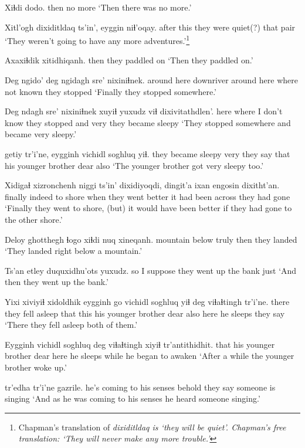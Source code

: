 \documentclass[12pt]{article}
\begin{document}
\gll Xiɬdi dodo.
then {no more}
\glt `Then there was no more.'
\glend

\gll Xitl'ogh dixiditldaq  ts'in', eyggin niɬ'oqay.
{after this} {they were quiet(?)} {} that  pair
\glt `They weren't going to have any more adventures.'\footnote{Chapman's translation of \em dixiditldaq \em is `they will be quiet'. Chapman's free translation: `They will never make any more trouble.'}
\glend

\gll Axaxiɬdik xitidhiqanh.
then  {they paddled on}
\glt `Then they paddled on.'
\glend

\gll Deg ngido' deg ngidagh sre' nixiniɬnek.
{around here} downriver {around here} where {not known} {they stopped}
\glt `Finally they stopped somewhere.'
\glend

\gll Deg ndagh sre'  nixiniɬnek xuyiɬ yuxudz {viɬ dixivitathdlen'.}
here where {I don't know} {they stopped} and very {they became sleepy}
\glt `They stopped somewhere and became very sleepy.'
\glend

 getiy tr'i'ne, eygginh vichidl  soghluq yiɬ.
{they became sleepy}  very {they say} that {his younger brother} dear also
\glt `The younger brother got very sleepy too.'
\glend

\gll Xidigaɬ xizronchenh {niggi ts'in'} dixidiyoqdi, {dingit'a ixan} engosin dixitht'an.
finally  indeed  {to shore} {when they went} {better it had been} across {they had gone}
\glt `Finally they went to shore, (but) it would have been better if they had gone to the other shore.'
\glend

\gll Deloy  ghotthegh ɬogo xiɬdi {nuq xineqanh.}
mountain below  truly then {they landed}
\glt `They landed right below a mountain.'
\glend

\gll Ts'an etley  duquxidhu'ots  yuxudz.
so {I suppose} {they went up the bank} just
\glt `And then they went up the bank.'
\glend

\gll Yixi {xiviyiɬ xidoldhik} eygginh go vichidl soghluq yiɬ deg viɬaɬtingh tr'i'ne.
there {they fell asleep} that this {his younger brother} dear also here {he sleeps} {they say}
\glt `There they fell asleep both of them.'
\glend

\gll Eygginh vichidl  soghluq deg viɬaɬtingh xiyiɬ tr'antithidhit.
that {his younger brother} dear here {he sleeps} while {he began to awaken}
\glt `After a while the younger brother woke up.'
\glend

 tr'edha tr'i'ne gazrile.
{he's coming to his senses} behold {they say} {someone is singing}
\glt `And as he was coming to his senses he heard someone singing.'
\glend
\end{document}
